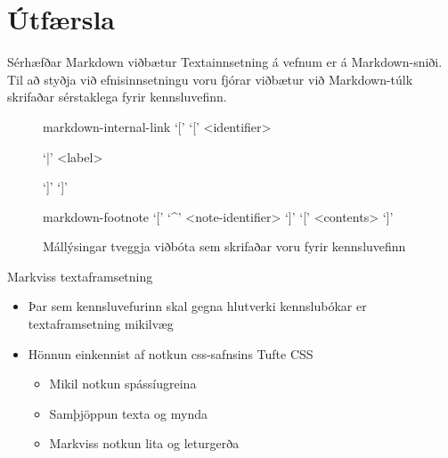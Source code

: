 \documentclass[hi-blar]{beamer}
\begin{document}
\section{Útfærsla}

\begin{frame}{Sérhæfðar Markdown viðbætur}
Textainnsetning á vefnum er á Markdown-sniði. Til að styðja við efnisinnsetningu voru fjórar viðbætur við Markdown-túlk skrifaðar sérstaklega fyrir kennsluvefinn.
\begin{center}
    \begin{minipage}{0.9\textwidth}
        \begin{figure}
            \caption{Mállýsingar tveggja viðbóta sem skrifaðar voru fyrir kennsluvefinn}
            \label{fig:markdown-internal-link}
            \begin{syntaxenv}{markdown-internal-link}
                `[' `[' <identifier>
                \begin{stack}
                    `|' <label>\\
                \end{stack}
                `]' `]'
            \end{syntaxenv}
            \begin{syntaxenv}{markdown-footnote}
                `[' `\textasciicircum' <note-identifier> `]' `[' <contents> `]'
            \end{syntaxenv}
        \end{figure}
    \end{minipage}
\end{center}
\end{frame}

\begin{frame}{Markviss textaframsetning}
    \begin{itemize}
        \item Þar sem kennsluvefurinn skal gegna hlutverki kennslubókar er textaframsetning mikilvæg
        \item Hönnun einkennist af notkun css-safnsins Tufte CSS 
        \begin{itemize}
            \item Mikil notkun spássíugreina
            \item Samþjöppun texta og mynda
            \item Markviss notkun lita og leturgerða
        \end{itemize}
    \end{itemize}
\end{frame}
\end{document}
